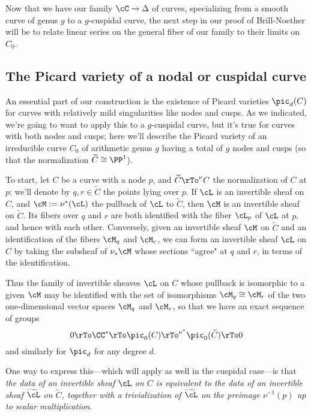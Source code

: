 Now that we have our family $\cC \to \Delta$ of curves, specializing from a smooth curve of genus $g$ to a $g$-cuspidal curve, the next step in our proof of Brill-Noether will be to relate linear series on the general fiber of our family to their limits on $C_0$.

\subsection{The Picard variety of a nodal or cuspidal curve}

An essential part of our construction is the existence of Picard varieties $\pic_d(C)$ for curves with relatively mild singularities like nodes and cusps. As we indicated, we're going to want to apply this to a $g$-cuspidal curve, but it's true for curves with both nodes and cusps; here we'll describe the Picard variety of an irreducible curve $C_0$ of arithmetic genus $g$ having a total of $g$ nodes and cusps (so that the normalization $\widetilde C \cong \PP^1$).


To start, let $C$ be a curve with a node $p$, and $\widetilde C \rTo^\nu C$ the normalization of $C$ at $p$; we'll denote by $q,r \in \widetilde C$ the points lying over $p$. If $\cL$ is an invertible sheaf on $C$, and $\cM := \nu^*(\cL)$ the pullback of $\cL$ to $\widetilde C$, then $\cM$ is an invertible sheaf on $\widetilde C$. Its fibers over $q$ and $r$ are both identified with the fiber $\cL_p$ of $\cL$ at $p$, and hence with each other. Conversely, given an invertible sheaf $\cM$ on $\widetilde C$ and an identification of the fibers $\cM_q$ and $\cM_r$, we can form an invertible sheaf $\cL$ on $C$ by taking the subsheaf of $\nu_*\cM$ whose sections ``agree" at $q$ and $r$, in terms of the identification. 


Thus the family of invertible sheaves $\cL$ on $C$ whose pullback is isomorphic to a given $\cM$ may be identified with the set of isomorphisms $\cM_q \cong \cM_r$ of the two one-dimensional vector spaces $\cM_q$ and $\cM_r$, so that  we have an exact sequence of groups
$$
0 \rTo  \CC^* \rTo \pic_0(C) \rTo^{\nu^*}  \pic_0(\widetilde C) \rTo 0
$$
and similarly for $\pic_d$ for any degree $d$.

One way to express this---which will apply as well in the cuspidal case---is that \emph{the data of an invertible sheaf $\cL$ on $C$ is equivalent to the data of an invertible sheaf $\widetilde \cL$ on $\widetilde C$, together with a trivialization of $\widetilde \cL$ on the preimage $\nu^{-1}(p)$ up to scalar multiplication}.


